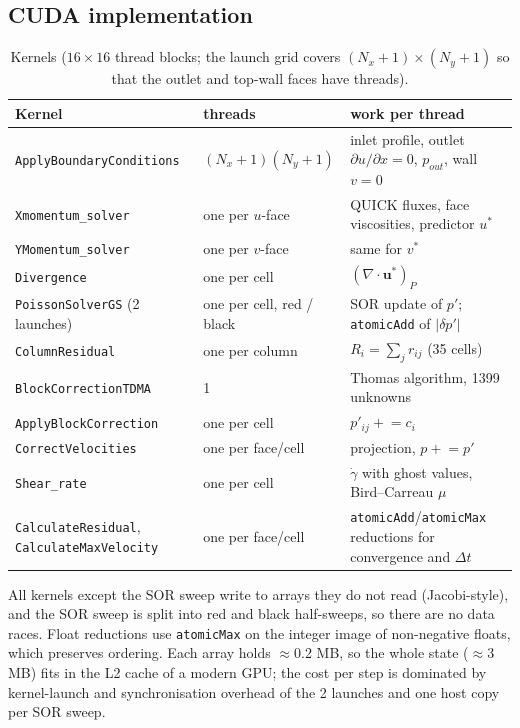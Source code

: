 \subsection{CUDA implementation}
\begin{table}[H]\centering\small
\begin{tabular}{p{4.1cm}p{3.3cm}p{7.6cm}}\toprule
Kernel & threads & work per thread\\\midrule
\texttt{ApplyBoundaryConditions} & $(N_x+1)(N_y+1)$ & inlet profile, outlet $\partial u/\partial x=0$, $p_{out}$, wall $v=0$\\
\texttt{Xmomentum\_solver} & one per $u$-face & QUICK fluxes, face viscosities, predictor $u^*$\\
\texttt{YMomentum\_solver} & one per $v$-face & same for $v^*$\\
\texttt{Divergence} & one per cell & $(\nabla\cdot\mathbf{u}^*)_P$\\
\texttt{PoissonSolverGS} (2 launches) & one per cell, red / black & SOR update of $p'$; \texttt{atomicAdd} of $|\delta p'|$\\
\texttt{ColumnResidual} & one per column & $R_i=\sum_j r_{ij}$ (35 cells)\\
\texttt{BlockCorrectionTDMA} & 1 & Thomas algorithm, 1399 unknowns\\
\texttt{ApplyBlockCorrection} & one per cell & $p'_{ij}\mathrel{+}=c_i$\\
\texttt{CorrectVelocities} & one per face/cell & projection, $p\mathrel{+}=p'$\\
\texttt{Shear\_rate} & one per cell & $\dot\gamma$ with ghost values, Bird--Carreau $\mu$\\
\texttt{CalculateResidual}, \texttt{CalculateMaxVelocity} & one per face/cell & \texttt{atomicAdd}/\texttt{atomicMax} reductions for convergence and $\Delta t$\\\bottomrule
\end{tabular}\caption{Kernels ($16\times16$ thread blocks; the launch grid covers $(N_x+1)\times(N_y+1)$ so that the outlet and top-wall faces have threads).}\end{table}
All kernels except the SOR sweep write to arrays they do not read (Jacobi-style), and the SOR sweep is split into red and black half-sweeps, so there are no data races. Float reductions use \texttt{atomicMax} on the integer image of non-negative floats, which preserves ordering. Each array holds $\approx$0.2 MB, so the whole state ($\approx$3 MB) fits in the L2 cache of a modern GPU; the cost per step is dominated by kernel-launch and synchronisation overhead of the 2 launches and one host copy per SOR sweep.

